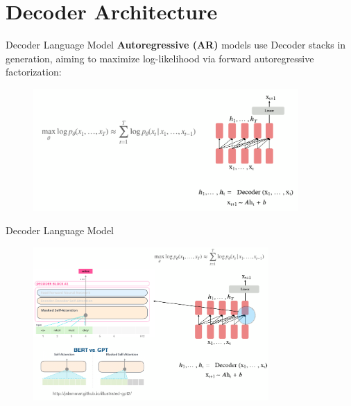 \documentclass[serif, aspectratio=169]{beamer}
\begin{document}
\section{Decoder Architecture}

\begin{frame}{Decoder Language Model}
    \textbf{Autoregressive (AR)} models use Decoder stacks in generation, aiming to
    maximize log-likelihood via forward autoregressive factorization:
    \begin{figure}
        \centering
        \includegraphics[width=0.9\textwidth]{Figures/decoderlm.png}
    \end{figure}
\end{frame}

\begin{frame}{Decoder Language Model}
    \begin{figure}
        \centering
        \includegraphics[width=0.8\textwidth]{Figures/decodelm1.png}
    \end{figure}
\end{frame}
\end{document}
